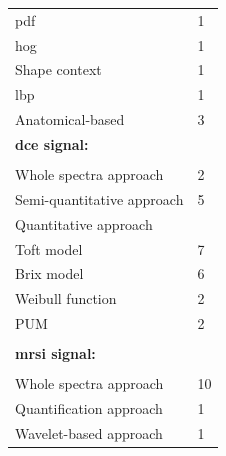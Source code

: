 \documentclass[a4paper,num-refs]{wiley-article}
\begin{document}
\begin{table}
\begin{threeparttable}
\begin{tabular}{p{.5\linewidth} p{.4\linewidth}}
      \quad \quad \quad \acs{pdf} & 1 \\
      \quad \quad \quad \acs{hog} & 1 \\
      \quad \quad \quad Shape context & 1 \\
      \quad \quad \quad \acs{lbp} & 1 \\
      \quad \quad Anatomical-based & 3 \\
      \textbf{\ac{dce} signal:} & \\ \\ [-1.5ex]
      \quad Whole spectra approach & 2 \\
      \quad Semi-quantitative approach & 5 \\
      \quad Quantitative approach &  \\
      \quad \quad Toft model & 7 \\
      \quad \quad Brix model & 6 \\
      \quad \quad Weibull function & 2 \\
      \quad \quad PUM & 2 \\
      \\ [-1.5ex]
      \textbf{\ac{mrsi} signal:} & \\ \\ [-1.5ex]
      \quad Whole spectra approach & 10 \\
      \quad Quantification approach & 1 \\
      \quad Wavelet-based approach & 1 \\
      \hline
    \end{tabular}
  \end{threeparttable}
\end{table}



\end{document}

